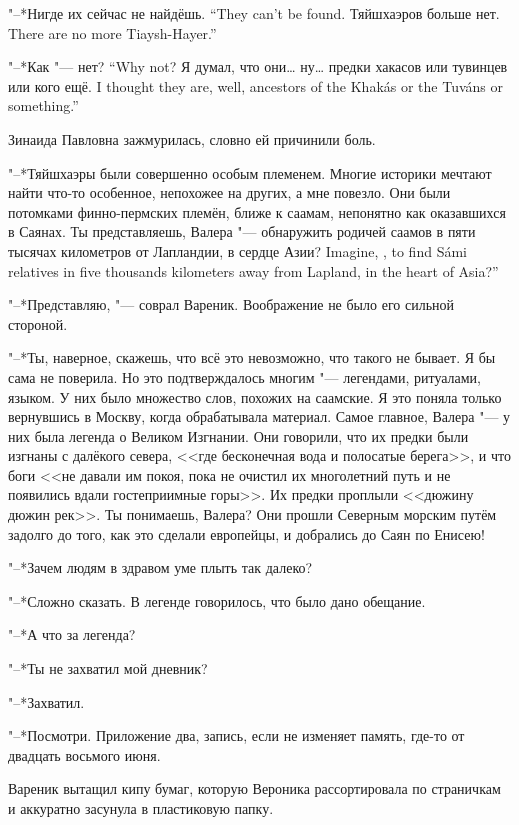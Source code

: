 {"--*Нигде их сейчас не найдёшь.}
{``They can't be found.}
{Тяйшхаэров больше нет.}
{There are no more Tiaysh-Hayer.''}

{"--*Как "--- нет?}
{``Why not?}
{Я думал, что они\ldots{} ну\ldots{} предки хакасов или тувинцев или кого ещё.}
{I thought they are, well, ancestors of the Khak\'as or the Tuv\'ans or something.''}

Зинаида Павловна зажмурилась, словно ей причинили боль.

"--*Тяйшхаэры были совершенно особым племенем.
Многие историки мечтают найти что-то особенное, непохожее на других, а мне повезло.
Они были потомками финно-пермских племён, ближе к саамам, непонятно как оказавшихся в Саянах.
{Ты представляешь, Валера "--- обнаружить родичей саамов в пяти тысячах километров от Лапландии, в сердце Азии?}
{Imagine, \Valera, to find S\'ami relatives in five thousands kilometers away from Lapland, in the heart of Asia?''}

"--*Представляю, "--- соврал Вареник.
Воображение не было его сильной стороной.

"--*Ты, наверное, скажешь, что всё это невозможно, что такого не бывает.
Я бы сама не поверила.
Но это подтверждалось многим "--- легендами, ритуалами, языком.
У них было множество слов, похожих на саамские.
Я это поняла только вернувшись в Москву, когда обрабатывала материал.
Самое главное, Валера "--- у них была легенда о Великом Изгнании.
Они говорили, что их предки были изгнаны с далёкого севера, <<где бесконечная вода и полосатые берега>>, и что боги <<не давали им покоя, пока не очистил их многолетний путь и не появились вдали гостеприимные горы>>.
Их предки проплыли <<дюжину дюжин рек>>.
Ты понимаешь, Валера?
Они прошли Северным морским путём задолго до того, как это сделали европейцы, и добрались до Саян по Енисею!

"--*Зачем людям в здравом уме плыть так далеко?

"--*Сложно сказать.
В легенде говорилось, что было дано обещание.

"--*А что за легенда?

"--*Ты не захватил мой дневник?

"--*Захватил.

"--*Посмотри.
Приложение два, запись, если не изменяет память, где-то от двадцать восьмого июня.

Вареник вытащил кипу бумаг, которую Вероника рассортировала по страничкам и аккуратно засунула в пластиковую папку.

